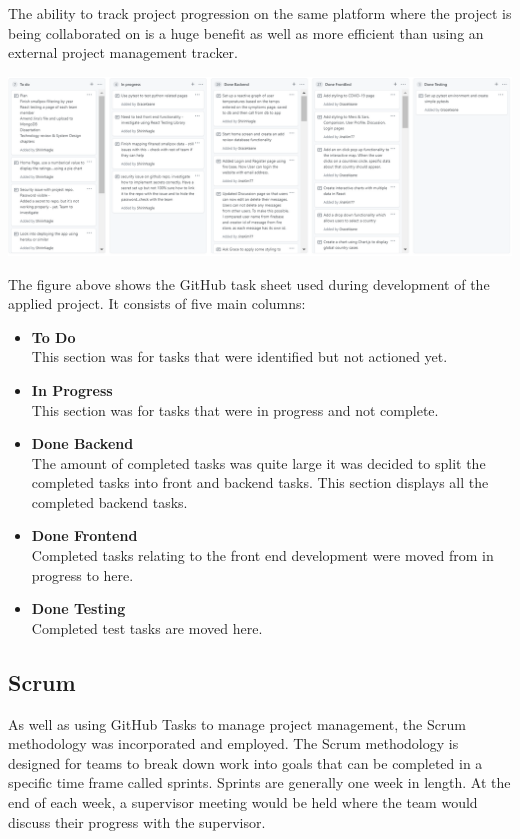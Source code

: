 \vspace{50mm} %

The ability to track project progression on the same platform where the project is being collaborated on is a huge benefit as well as more efficient than using an external project management tracker. 

\begin{center}
      \includegraphics[scale=0.50]{img/GitHubToDo.PNG}
\end{center}
\label{fig:x Github Tasks}


The figure above shows the GitHub task sheet used during development of the applied project. It consists of five main columns:

\begin{itemize}
\item \textbf{To Do}\\
This section was for tasks that were identified but not actioned yet.
\item \textbf{In Progress}\\
This section was for tasks that were in progress and not complete.
\item \textbf{Done Backend}\\
The amount of completed tasks was quite large it was decided to split the completed tasks into front and backend tasks. This section displays all the completed backend tasks.
\item \textbf{Done Frontend}\\
Completed tasks relating to the front end development were moved from in progress to here.
\item \textbf{Done Testing}\\
Completed test tasks are moved here.
\end{itemize}


\subsection{Scrum}
As well as using GitHub Tasks to manage project management, the Scrum methodology was incorporated and employed. The Scrum methodology is designed for teams to break down work into goals that can be completed in a specific time frame called sprints. Sprints are generally one week in length. At the end of each week, a supervisor meeting would be held where the team would discuss their progress with the supervisor.

